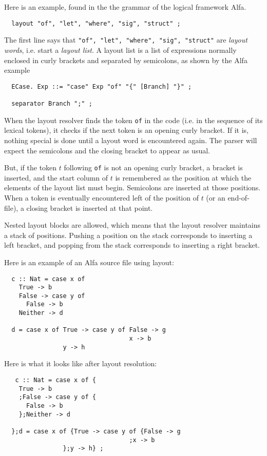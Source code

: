 \documentclass[10pt]{article}
\begin{document}
Here is an example, found in the the grammar of the logical framework Alfa.
\begin{verbatim}
  layout "of", "let", "where", "sig", "struct" ;
\end{verbatim}
The first line says that {\tt "of", "let", "where", "sig", "struct"}
are {\em layout words}, i.e. start a 
{\em layout list}. A layout list is a list of expressions
normally enclosed in curly brackets and separated by semicolons,
as shown by the Alfa example
\begin{verbatim}
  ECase. Exp ::= "case" Exp "of" "{" [Branch] "}" ;

  separator Branch ";" ;
\end{verbatim}
When the layout resolver finds the token {\tt of} in the code
(i.e. in the sequence of its lexical tokens), it 
checks if the next token is an opening curly bracket. If it
is, nothing special is done until a layout word is encountered again.
The parser will expect the semicolons and the closing bracket 
to appear as usual.

But, if the token $t$
following {\tt of} is not an opening curly bracket,
a bracket is inserted, and the start column of $t$
is remembered as the position at which the elements of the
layout list must begin. Semicolons are inserted at those
positions. When a token is eventually encountered left
of the position of $t$ (or an end-of-file), a closing bracket
is inserted at that point.

Nested layout blocks are allowed, which means that the layout
resolver maintains a stack of positions. Pushing a position
on the stack corresponds to inserting a left bracket, and
popping from the stack corresponds to inserting a right bracket.

Here is an example of an Alfa source file using layout:
\begin{verbatim}
  c :: Nat = case x of 
    True -> b
    False -> case y of
      False -> b
    Neither -> d

  d = case x of True -> case y of False -> g
                                  x -> b
                y -> h
\end{verbatim}
Here is what it looks like after layout resolution:
\begin{verbatim}
   c :: Nat = case x of {
    True -> b
    ;False -> case y of {
      False -> b
    };Neither -> d
  
  };d = case x of {True -> case y of {False -> g
                                  ;x -> b
                };y -> h} ;
\end{verbatim}
\end{document}
